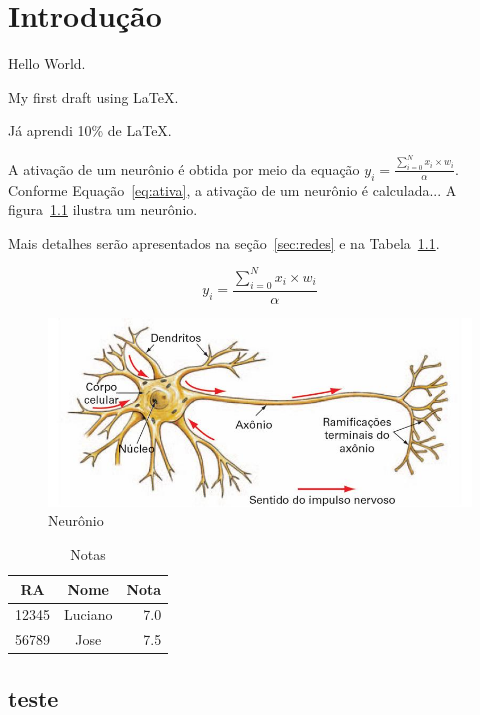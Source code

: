 \chapter{Introdução}
\lipsum[3-8]
Hello World.

My first draft using \LaTeX.

Já aprendi 10\% de \LaTeX.

A ativação de um neurônio é obtida por meio da equação $y_i = \frac{\sum_{i=0}^{N} x_i \times w_i }{\alpha}$.
Conforme Equação~\ref{eq:ativa}, a ativação de um neurônio é calculada...
A figura~\ref{fig:neuronio} ilustra um neurônio.

Mais detalhes serão apresentados na seção~\ref{sec:redes} e na Tabela~\ref{tab:notas}.

\begin{equation}
	y_i = \frac{\sum_{i=0}^{N} x_i \times w_i }{\alpha}
	\label{eq:ativa}
\end{equation}

\begin{figure}[htb]
	\centering
	\includegraphics[scale=.4]{neuronio}
	\caption{Neurônio}\label{fig:neuronio}
\end{figure}

\begin{table}[htb]
	\caption{Notas}\label{tab:notas}
	\begin{tabular}{ccr}
		\hline
		\bf RA & \bf Nome & \bf Nota \\
		\hline
		12345 & Luciano & 7.0 \\
		56789 & Jose & 7.5 \\
		\hline
	\end{tabular}
\end{table}

\section{teste}